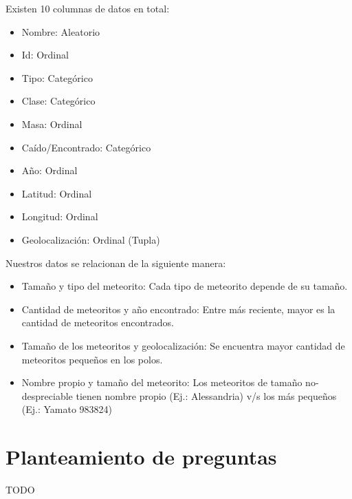 \documentclass[letterpaper,10pt]{article}
\begin{document}
	Existen 10 columnas de datos en total:

	\begin{itemize}
		\item Nombre: Aleatorio
		\item Id: Ordinal
		\item Tipo: Categórico
		\item Clase: Categórico
		\item Masa: Ordinal

		\item Caído/Encontrado: Categórico
		\item Año: Ordinal
		\item Latitud: Ordinal
		\item Longitud: Ordinal
		\item Geolocalización: Ordinal (Tupla)
	\end{itemize}

	Nuestros datos se relacionan de la siguiente manera:

	\begin{itemize}
		\item Tamaño y tipo del meteorito: Cada tipo de meteorito depende de su tamaño.
		\item Cantidad de meteoritos y año encontrado: Entre más reciente, mayor es la cantidad de meteoritos encontrados.
		\item Tamaño de los meteoritos y geolocalización: Se encuentra mayor cantidad de meteoritos pequeños en los polos.
		\item Nombre propio y tamaño del meteorito: Los meteoritos de tamaño no-despreciable tienen nombre propio (Ej.: Alessandria) v/s los más pequeños (Ej.: Yamato 983824)
	\end{itemize}

	\newpage

	\section{Planteamiento de preguntas}

	TODO

	\newpage
\end{document}
